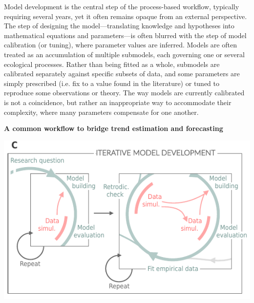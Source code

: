 \documentclass[11pt]{article}
\begin{document}
\begin{tcolorbox}
{\begin{multicols}{2}
\noindent %
Model development is the central step of the process-based workflow, typically requiring several years, yet it often remains opaque from an external perspective. The step of designing the model---translating knowledge and hypotheses into mathematical equations and parameters---is often blurred with the step of model calibration (or tuning), where parameter values are inferred. Models are often treated as an accumulation of multiple submodels, each governing one or several ecological processes. Rather than being fitted as a whole, submodels are calibrated separately against specific subsets of data, and some parameters are simply prescribed (i.e. fix to a value found in the literature) or tuned to reproduce some observations or theory. The way models are currently calibrated is not a coincidence,
but rather an inappropriate way to accommodate their complexity, where many parameters compensate for one another.

\vfill

\end{multicols}}

\centerline{\bf A common workflow to bridge trend estimation and forecasting}
\vspace*{-3mm}
{\begin{multicols}{2}
\begin{minipage}[t]{\linewidth}
\includegraphics[width=\linewidth]{figures/iterativeworkflow_details}
    

\end{minipage}
\end{multicols}}
\end{tcolorbox}
\end{document}
